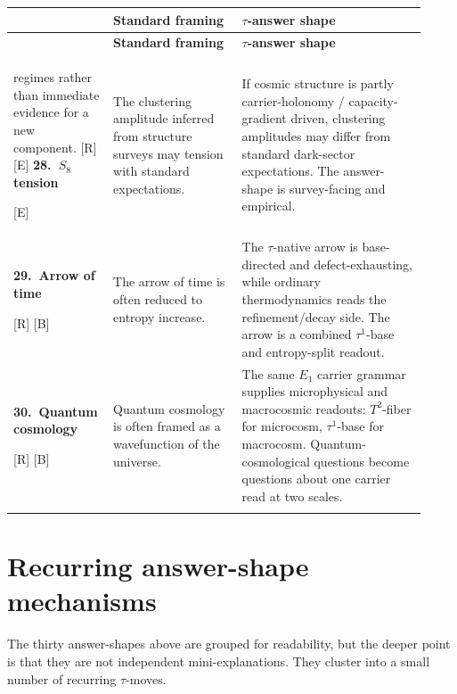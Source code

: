 \documentclass{pantarhei-researchnote}
\makeatletter
\newcommand{\Rtag}{\textcolor{pr-lane-verify}{\textsc{[R]}}}
\newcommand{\Btag}{\textcolor{pr-lane-results}{\textsc{[B]}}}
\newcommand{\Etag}{\textcolor{pr-lane-publications}{\textsc{[E]}}}
\newcommand{\ledgerrow}[5]{%
  \textbf{#1.\ #2}\par{\scriptsize\sffamily #5} &
  #3 &
  #4 \\
  \addlinespace[0.35em]
}
\newenvironment{clusterledger}{%
  \renewcommand{\arraystretch}{1.18}%
  \footnotesize
  \begin{longtable}{@{}>{\RaggedRight\arraybackslash}p{0.19\linewidth}%
    >{\RaggedRight\arraybackslash}p{0.30\linewidth}%
    >{\RaggedRight\arraybackslash}p{0.43\linewidth}@{}}
  \toprule
  {\sffamily\bfseries\color{pr-brand-700}Question} &
  {\sffamily\bfseries\color{pr-brand-700}Standard framing} &
  {\sffamily\bfseries\color{pr-brand-700}\(\tau\)-answer shape} \\
  \midrule
  \endfirsthead
  \toprule
  {\sffamily\bfseries\color{pr-brand-700}Question} &
  {\sffamily\bfseries\color{pr-brand-700}Standard framing} &
  {\sffamily\bfseries\color{pr-brand-700}\(\tau\)-answer shape} \\
  \midrule
  \endhead
}{%
  \bottomrule
  \end{longtable}
  \normalsize
}
\makeatother
\begin{document}
\begin{clusterledger}
{regimes rather than immediate evidence for a new component.}
{\Rtag{} \Etag}
\ledgerrow{28}{\(S_8\) tension}
{The clustering amplitude inferred from structure surveys may tension with
standard expectations.}
{If cosmic structure is partly carrier-holonomy / capacity-gradient driven,
clustering amplitudes may differ from standard dark-sector expectations. The
answer-shape is survey-facing and empirical.}
{\Etag}
\ledgerrow{29}{Arrow of time}
{The arrow of time is often reduced to entropy increase.}
{The \(\tau\)-native arrow is base-directed and defect-exhausting, while
ordinary thermodynamics reads the refinement/decay side. The arrow is a
combined \(\tau^1\)-base and entropy-split readout.}
{\Rtag{} \Btag}
\ledgerrow{30}{Quantum cosmology}
{Quantum cosmology is often framed as a wavefunction of the universe.}
{The same \(E_1\) carrier grammar supplies microphysical and macrocosmic
readouts: \(T^2\)-fiber for microcosm, \(\tau^1\)-base for macrocosm.
Quantum-cosmological questions become questions about one carrier read at two
scales.}
{\Rtag{} \Btag}
\end{clusterledger}

\section{Recurring answer-shape mechanisms}

The thirty answer-shapes above are grouped for readability, but the deeper
point is that they are not independent mini-explanations. They cluster into a
small number of recurring \(\tau\)-moves.
\end{document}
